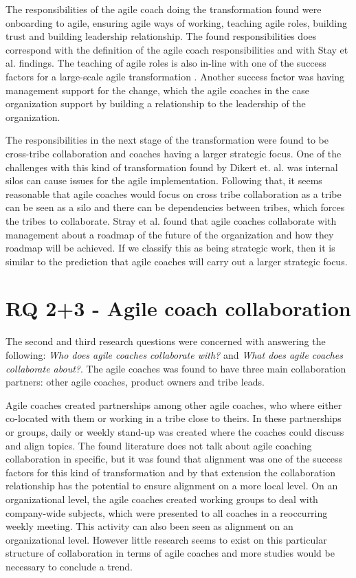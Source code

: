 \documentclass[11pt,a4paper]{report}
\begin{document}
The responsibilities of the agile coach doing the transformation found were onboarding to agile, ensuring agile ways of working, teaching agile roles, building trust and building leadership relationship. The found responsibilities does correspond with the definition of the agile coach responsibilities \cite{parizi2014hidden} and with Stay et al. \cite{stray2020agile} findings. The teaching of agile roles is also in-line with one of the success factors for a large-scale agile transformation \cite{dikert2016challenges}. Another success factor was having management support for the change, which the agile coaches in the case organization support by building a relationship to the leadership of the organization.

The responsibilities in the next stage of the transformation were found to be cross-tribe collaboration and coaches having a larger strategic focus. One of the challenges with this kind of transformation found by Dikert et. al. \cite{dikert2016challenges} was internal silos can cause issues for the agile implementation. Following that, it seems reasonable that agile coaches would focus on cross tribe collaboration as a tribe can be seen as a silo and there can be dependencies between tribes, which forces the tribes to collaborate. Stray et al. \cite{stray2020agile} found that agile coaches collaborate with management about a roadmap of the future of the organization and how they roadmap will be achieved. If we classify this as being strategic work, then it is similar to the prediction that agile coaches will carry out a larger strategic focus.


\section{RQ 2+3 - Agile coach collaboration}
The second and third research questions were concerned with answering the following: \textit{Who does agile coaches collaborate with?} and \textit{What does agile coaches collaborate about?}. The agile coaches was found to have three main collaboration partners: other agile coaches, product owners and tribe leads.

Agile coaches created partnerships among other agile coaches, who where either co-located with them or working in a tribe close to theirs. In these partnerships or groups, daily or weekly stand-up was created where the coaches could discuss and align topics. The found literature does not talk about agile coaching collaboration in specific, but it was found that alignment was one of the success factors for this kind of transformation \cite{dikert2016challenges} and by that extension the collaboration relationship has the potential to ensure alignment on a more local level. On an organizational level, the agile coaches created working groups to deal with company-wide subjects, which were presented to all coaches in a reoccurring weekly meeting. This activity can also been seen as alignment on an organizational level. However little research seems to exist on this particular structure of collaboration in terms of agile coaches and more studies would be necessary to conclude a trend.
\end{document}
